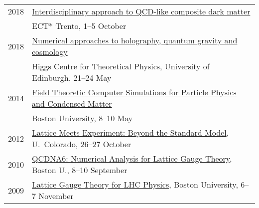 \documentclass[10 pt]{article}
\renewcommand{\section}[2]%
    {\pagebreak[2]\vspace{1.3\baselineskip}%
     \hspace{0in}%
     \marginpar{
     \raggedright \scshape #1}#2}
\newcommand{\blankline}{\quad\pagebreak[2]}
\newcommand{\spacer}{\blankline\vspace{12 pt}\blankline}
\begin{document}
\vspace{-12 pt} %
\begin{tabular}[t]{cl}
  2018  & \href{http://www.ectstar.eu/node/4226}{Interdisciplinary approach to QCD-like composite dark matter}                                                                        \\
        & ECT* Trento, 1--5 October                                                                                                                                                   \\[6 pt]
  2018  & \href{https://higgs.ph.ed.ac.uk/workshops/numerical-approaches-holography-quantum-gravity-and-cosmology}{Numerical approaches to holography, quantum gravity and cosmology} \\
        & Higgs Centre for Theoretical Physics, University of Edinburgh, 21--24 May                                                                                                   \\[6 pt]
  2014  & \href{http://blogs.bu.edu/ppcm/}{Field Theoretic Computer Simulations for Particle Physics and Condensed Matter}                                                            \\
        & Boston University, 8--10 May                                                                                                                                                \\[6 pt]
  2012  & \href{http://www-hep.colorado.edu/~schaich/lat-exp-2012/}{Lattice Meets Experiment: Beyond the Standard Model}, U.~Colorado, 26--27 October                                 \\[6 pt]
  2010  & \href{http://www-hep.colorado.edu/~schaich/QCDNA6/}{QCDNA6: Numerical Analysis for Lattice Gauge Theory}, Boston U., 8--10 September                                        \\[6 pt]
  2009  & \href{http://www-hep.colorado.edu/~schaich/LGTforLHC2009/}{Lattice Gauge Theory for LHC Physics}, Boston University, 6--7 November                                          \\
\end{tabular}

\spacer



\section{PhD students mentored} %
\end{document}
